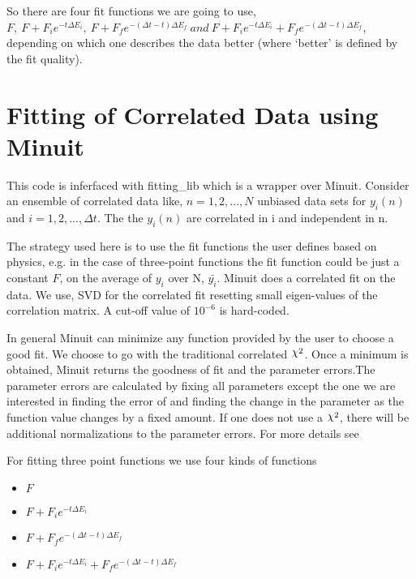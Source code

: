\documentclass[10pt]{article}
\DeclareRobustCommand{\rchi}{{\mathpalette\irchi\relax}}
\newcommand{\irchi}[2]{\raisebox{\depth}{$#1\chi$}} %
\begin{document}
So there are four fit functions we are going to use, $F,\   F + F_i e^{-t \Delta E_i},\ F + F_f e^{-(\Delta t - t ) \Delta E_f} \ and\ F + F_i e^{-t \Delta E_i} + F_f e^{-(\Delta t - t ) \Delta E_f}$, depending on which one describes the data better (where `better' is defined by the fit quality)\cite{shultz}.



\section{Fitting of Correlated Data using Minuit}
This code is inferfaced with {\myfont fitting\_lib} which is a wrapper over Minuit. Consider an ensemble of correlated data like, $n = 1,2,...,N$ unbiased data sets for $y_i(n)$ and $i = 1,2,...,\Delta t$. The the $y_i(n)$ are correlated in i and independent in n. \par
The strategy used here is to use the fit functions the user defines based on physics, e.g. in the case of three-point functions the fit function could be just a constant $F$, on the average of $y_i$ over N, $\bar{y_i}$. Minuit does a correlated fit on the data. We use, SVD for the correlated fit resetting small eigen-values of the correlation matrix. A cut-off value of $10^{-6}$ is hard-coded.\par
In general Minuit can minimize any function provided by the user to choose a good fit. We choose to go with the traditional correlated $\rchi^2$. Once a minimum is obtained, Minuit returns the goodness of fit and the parameter errors.The parameter errors are calculated by fixing all parameters except the one we are interested in finding the error of and finding the change in the parameter as the function value changes by a fixed amount.  If one does not use a $\rchi^2$, there will be additional normalizations to the parameter errors. For more details see \cite{minuit} \par
For fitting three point functions we use four kinds of functions
\begin{itemize}
	\item $F$
	\item $F + F_i e^{-t \Delta E_i}$
	\item $F + F_f e^{-(\Delta t - t ) \Delta E_f}$
	\item $F + F_i e^{-t \Delta E_i} + F_f e^{-(\Delta t - t ) \Delta E_f}$
\end{itemize}
\end{document}
